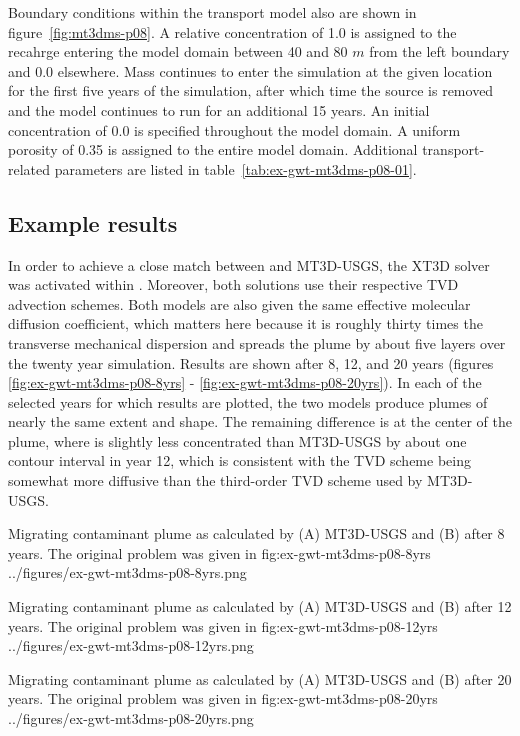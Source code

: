 Boundary conditions within the transport model also are shown in figure~\ref{fig:mt3dms-p08}.  A relative concentration of 1.0 is assigned to the recahrge entering the model domain between 40 and 80 $m$ from the left boundary and 0.0 elsewhere.  Mass continues to enter the simulation at the given location for the first five years of the simulation, after which time the source is removed and the model continues to run for an additional 15 years.  An initial concentration of 0.0 is specified throughout the model domain.  A uniform porosity of 0.35 is assigned to the entire model domain.  Additional transport-related parameters are listed in table~\ref{tab:ex-gwt-mt3dms-p08-01}.

\subsection{Example results}

In order to achieve a close match between \mf and MT3D-USGS, the XT3D solver was activated within \mf.  Moreover, both solutions use their respective TVD advection schemes.  Both models are also given the same effective molecular diffusion coefficient, which matters here because it is roughly thirty times the transverse mechanical dispersion and spreads the plume by about five layers over the twenty year simulation.  Results are shown after 8, 12, and 20 years (figures \ref{fig:ex-gwt-mt3dms-p08-8yrs} - \ref{fig:ex-gwt-mt3dms-p08-20yrs}).  In each of the selected years for which results are plotted, the two models produce plumes of nearly the same extent and shape.  The remaining difference is at the center of the plume, where \mf is slightly less concentrated than MT3D-USGS by about one contour interval in year 12, which is consistent with the \mf TVD scheme being somewhat more diffusive than the third-order TVD scheme used by MT3D-USGS.

\begin{StandardFigure}
	{Migrating contaminant plume as calculated by (A) MT3D-USGS and (B) \mf after 8 years.  The original problem was given in \citep{sudicky1989}} 
	{fig:ex-gwt-mt3dms-p08-8yrs}
	{../figures/ex-gwt-mt3dms-p08-8yrs.png}
\end{StandardFigure}

\begin{StandardFigure}
	{Migrating contaminant plume as calculated by (A) MT3D-USGS and (B) \mf after 12 years.  The original problem was given in \citep{sudicky1989}} 
	{fig:ex-gwt-mt3dms-p08-12yrs}
	{../figures/ex-gwt-mt3dms-p08-12yrs.png}
\end{StandardFigure}

\begin{StandardFigure}
	{Migrating contaminant plume as calculated by (A) MT3D-USGS and (B) \mf after 20 years.  The original problem was given in \citep{sudicky1989}} 
	{fig:ex-gwt-mt3dms-p08-20yrs}
	{../figures/ex-gwt-mt3dms-p08-20yrs.png}
\end{StandardFigure}
